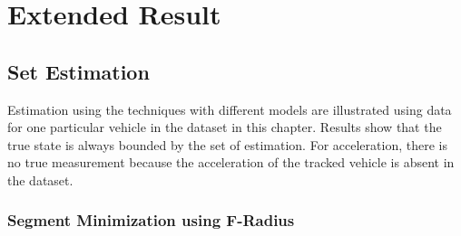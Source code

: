 \chapter{Extended Result}
\section{Set Estimation}\label{eresult:setest}
Estimation using the techniques with different models are illustrated using data for one particular vehicle in the dataset in this chapter. Results show that the true state is always bounded by the set of estimation. For acceleration, there is no true measurement because the acceleration of the tracked vehicle is absent in the dataset.
\FloatBarrier
\subsection{Segment Minimization using F-Radius}
\FloatBarrier
